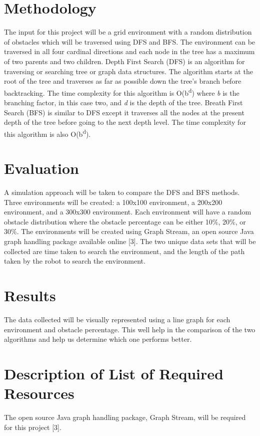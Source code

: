 \documentclass{article}
\begin{document}
\section{Methodology}
The input for this project will be a grid environment with a random distribution of obstacles which will be traversed using DFS and BFS. The environment can be traversed in all four cardinal directions and each node in the tree has a maximum of two parents and two children. Depth First Search (DFS) is an algorithm for traversing or searching tree or graph data structures. The algorithm starts at the root of the tree and traverses as far as possible down the tree's branch before backtracking. The time complexity for this algorithm is O(b\textsuperscript{d}) where \textit{b} is the branching factor, in this case two, and \textit{d} is the depth of the tree. Breath First Search (BFS) is similar to DFS except it traverses all the nodes at the present depth of the tree before going to the next depth level. The time complexity for this algorithm is also O(b\textsuperscript{d}).

\section{Evaluation}
A simulation approach will be taken to compare the DFS and BFS methods. Three environments will be created: a 100x100 environment, a 200x200 environment, and a 300x300 environment. Each environment will have a random obstacle distribution where the obstacle percentage can be either 10\%, 20\%, or 30\%. The environments will be created using Graph Stream, an open source Java graph handling package available online [3]. The two unique data sets that will be collected are time taken to search the environment, and the length of the path taken by the robot to search the environment.

\section{Results}
The data collected will be visually represented using a line graph for each environment and obstacle percentage. This well help in the comparison of the two algorithms and help us determine which one performs better.

\section{Description of List of Required Resources}
The open source Java graph handling package, Graph Stream, will be required for this project [3].
\end{document}
